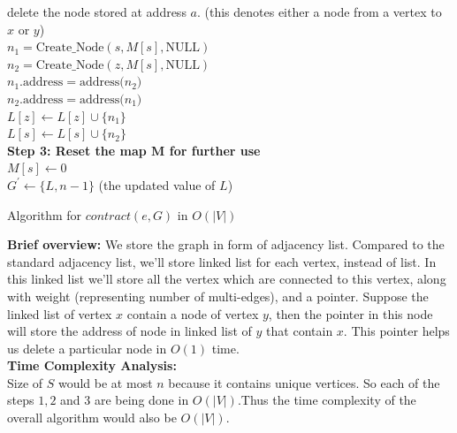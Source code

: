 \documentclass[a4paper]{article}
\begin{document}
\begin{algorithm}[H]
   {
    delete the node stored at address $a$. (this denotes either a node from a vertex to $x$ or $y$) \\
  }
   {
    $n_1 = \text{Create\_Node}(s, M[s], \text{NULL})$ \\
    $n_2 = \text{Create\_Node}(z, M[s], \text{NULL})$ \\
    $n_1.\text{address} = \text{address($n_2$)}$ \\
    $n_2.\text{address} = \text{address($n_1$)}$ \\
    $L[z] \leftarrow L[z] \cup \{ n_1 \}$ \\
    $L[s] \leftarrow L[s] \cup \{ n_2 \}$ \\
  }
  \textbf{Step 3: Reset the map $\mathbf{M}$ for further use} \\
   {
    $M[s] \leftarrow 0$ \\ 
  }
  $G^{'} \leftarrow \{L, n-1\}$ (the updated value of $L$) \\
 \caption{Algorithm for $contract(e, G)$ in $O(|V|)$}
\end{algorithm}
\newpage
\textbf{Brief overview: }
    We store the graph in form of adjacency list. Compared to the standard adjacency list, we'll store linked list for each vertex, instead of list. In this linked list we'll store all the vertex which are connected to this vertex, along with weight (representing number of multi-edges), and a pointer. Suppose the linked list of vertex $x$ contain a node of vertex $y$, then the pointer in this node will store the address of node in linked list of $y$ that contain $x$. This pointer helps us delete a particular node in $O(1)$ time.  
    \\
\textbf{Time Complexity Analysis:}\\
Size of $S$ would be at most $n$ because it contains unique vertices.
So each of the steps $1,2$ and $3$ are being done in $O(|V|)$.Thus the time complexity of the overall algorithm would also be $O(|V|).$
\pagebreak
\end{document}
